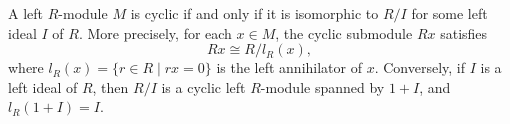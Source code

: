 A left $R$-module $M$ is cyclic if and only if it is isomorphic to $R/I$ for some left ideal $I$ of $R$. More precisely, for each $x \in M$, the cyclic submodule $Rx$ satisfies
$$Rx \cong R / l_R(x),$$
where $l_R(x) = \{r \in R \mid rx = 0\}$ is the left annihilator of $x$. Conversely, if $I$ is a left ideal of $R$, then $R/I$ is a cyclic left $R$-module spanned by $1 + I$, and $l_R(1 + I) = I$.
